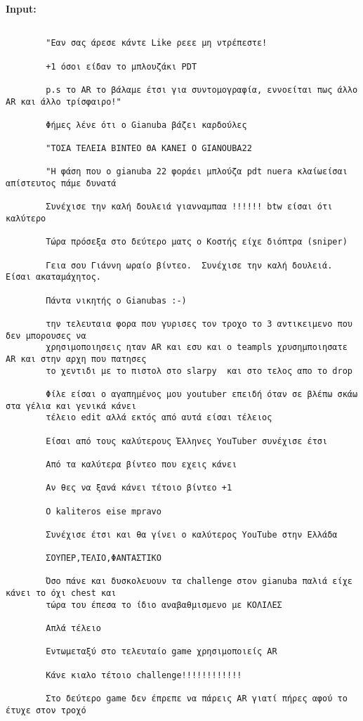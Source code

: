 \documentclass[11pt, a4paper]{article}
\begin{document}
	\textbf{Input:}
	\begin{verbatim}
		
		"Εαν σας άρεσε κάντε Like ρεεε μη ντρέπεστε!
		
		+1 όσοι είδαν το μπλουζάκι PDT
		
		p.s το AR το βάλαμε έτσι για συντομογραφία, εννοείται πως άλλο AR και άλλο τρίσφαιρο!"
		
		Φήμες λένε ότι ο Gianuba βάζει καρδούλες
		
		"ΤΟΣΑ ΤΕΛΕΙΑ ΒΙΝΤΕΟ ΘΑ ΚΑΝΕΙ Ο GIANOUBA22
		
		"Η φάση που ο gianuba 22 φοράει μπλούζα pdt nuera κλαίωείσαι απίστευτος πάμε δυνατά
		
		Συνέχισε την καλή δουλειά γιανναμπαα !!!!!! btw είσαι ότι καλύτερο 
		
		Τώρα πρόσεξα στο δεύτερο ματς ο Κοστής είχε διόπτρα (sniper)
		
		Γεια σου Γιάννη ωραίο βίντεο.  Συνέχισε την καλή δουλειά.  Είσαι ακαταμάχητος. 
		
		Πάντα νικητής ο Gianubas :-)
		
		την τελευταια φορα που γυρισες τον τροχο το 3 αντικειμενο που δεν μπορουσες να 
		χρησιμοποιησεις ηταν AR και εσυ και ο teampls χρυσημποιησατε  AR και στην αρχη που πατησες 
		το χεντιδι με το πιστολ στο slarpy  και στο τελος απο το drop
		
		Φίλε είσαι ο αγαπημένος μου youtuber επειδή όταν σε βλέπω σκάω στα γέλια και γενικά κάνει 
		τέλειο edit αλλά εκτός από αυτά είσαι τέλειος
		
		Είσαι από τους καλύτερους Έλληνες YouTuber συνέχισε έτσι 
		
		Από τα καλύτερα βίντεο που εχεις κάνει
		
		Αν θες να ξανά κάνει τέτοιο βίντεο +1
		
		O kaliteros eise mpravo 
		
		Συνέχισε έτσι και θα γίνει ο καλύτερος YouTube στην Ελλάδα
		
		ΣΟΥΠΕΡ,ΤΕΛΙΟ,ΦΑΝΤΑΣΤΙΚΟ
		
		Όσο πάνε και δυσκολευουν τα challenge στον gianuba παλιά είχε κάνει το όχι chest και 
		τώρα του έπεσα το ίδιο αναβαθμισμενο με ΚΟΛΙΛΕΣ
		
		Απλά τέλειο
		
		Εντωμεταξύ στο τελευταίο game χρησιμοποιείς AR
		
		Κάνε κιαλο τέτοιο challenge!!!!!!!!!!!!
		
		Στο δεύτερο game δεν έπρεπε να πάρεις AR γιατί πήρες αφού το έτυχε στον τροχό
		

\end{verbatim}
\end{document}
